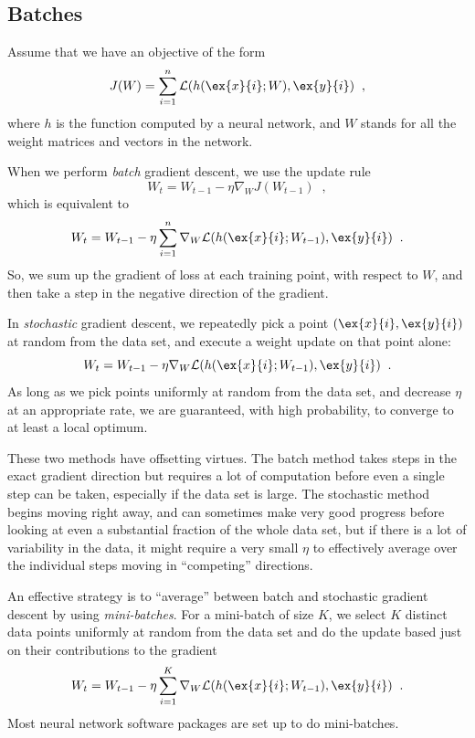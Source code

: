 \subsection{Batches}
Assume that we have an objective of the form
\[J(W) = \sum_{i = 1}^n \mathcal{L}(h(\ex{x}{i}; W),  \ex{y}{i})\;\;,\]
where $h$ is the function computed by a neural network, and $W$ stands
for all the weight matrices and vectors in the network.

When we perform {\em batch} gradient descent, we use the update rule
\[W_t = W_{t-1} - \eta\nabla_W J(W_{t-1})\;\;,\]
which is equivalent to
\[W_t = W_{t-1} - \eta\sum_{i=1}^n \nabla_W \mathcal{L}(h(\ex{x}{i}; W_{t-1}),
  \ex{y}{i})\;\;.\]
So, we sum up the gradient of loss at each training point,  with
respect to $W$, and then take a step in the negative direction of
the gradient.

In {\em stochastic} gradient descent, we repeatedly pick a point
$(\ex{x}{i}, \ex{y}{i})$ at random from the data set, and execute a
weight update on that point alone:
\[W_t = W_{t-1} - \eta \nabla_W \mathcal{L}(h(\ex{x}{i}; W_{t-1}),
  \ex{y}{i})\;\;.\]
As long as we pick points uniformly at random from the data set, and
decrease $\eta$ at an appropriate rate, we are guaranteed, with high
probability, to converge to at least a local optimum.

These two methods have offsetting virtues.  The batch method takes
steps in the exact gradient direction but requires a lot of
computation before even a single step can be taken, especially if the
data set is large.  The stochastic method begins moving right away,
and can sometimes make very good progress before looking at even a
substantial fraction of the whole data set, but if there is a lot of
variability in the data, it might require a very small $\eta$ to
effectively average over the individual steps moving in ``competing''
directions.

An effective strategy is to ``average'' between batch and stochastic
gradient descent by using {\em mini-batches}.  For a mini-batch of
size $K$, we select $K$ distinct data points uniformly at random from the data
set and do the update based just on their contributions to the gradient
\[W_t = W_{t-1} - \eta\sum_{i=1}^K \nabla_W \mathcal{L}(h(\ex{x}{i}; W_{t-1}),
  \ex{y}{i})\;\;.\]
Most neural network software packages are set up to do mini-batches.

